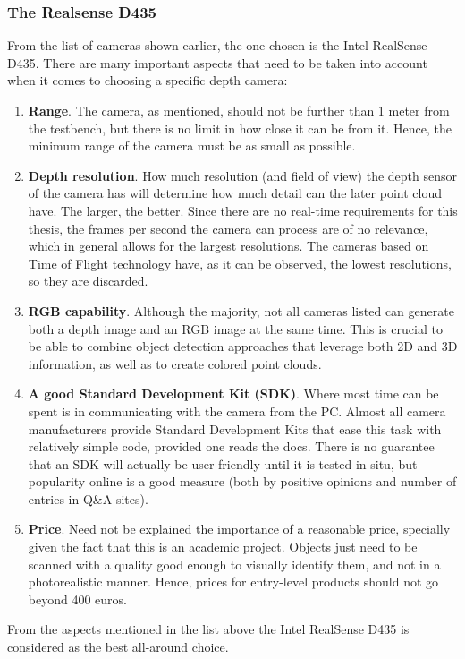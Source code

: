 \documentclass[../main.tex]{subfiles}
\begin{document}
\subsubsection{The Realsense D435}
From the list of cameras shown earlier, the one chosen is the Intel RealSense D435. There are many important aspects that need to be taken into account when it comes to choosing a specific depth camera:
\begin{enumerate}
    \item \textbf{Range}. The camera, as mentioned, should not be further than 1 meter from the testbench, but there is no limit in how close it can be from it. Hence, the minimum range of the camera must be as small as possible.
    \item \textbf{Depth resolution}. How much resolution (and field of view) the depth sensor of the camera has will determine how much detail can the later point cloud have. The larger, the better. Since there are no real-time requirements for this thesis, the frames per second the camera can process are of no relevance, which in general allows for the largest resolutions. The cameras based on Time of Flight technology have, as it can be observed, the lowest resolutions, so they are discarded. 
    \item \textbf{RGB capability}. Although the majority, not all cameras listed can generate both a depth image and an RGB image at the same time. This is crucial to be able to combine object detection approaches that leverage both 2D and 3D information, as well as to create colored point clouds.
    \item \textbf{A good Standard Development Kit (SDK)}. Where most time can be spent is in communicating with the camera from the PC. Almost all camera manufacturers provide Standard Development Kits that ease this task with relatively simple code, provided one reads the docs. There is no guarantee that an SDK will actually be user-friendly until it is tested in situ, but popularity online is a good measure (both by positive opinions and number of entries in Q\&A sites).
    \item \textbf{Price}. Need not be explained the importance of a reasonable price, specially given the fact that this is an academic project. Objects just need to be scanned with a quality good enough to visually identify them, and not in a photorealistic manner. Hence, prices for entry-level products should not go beyond 400 euros.
\end{enumerate}
From the aspects mentioned in the list above the Intel RealSense D435 is considered as the best all-around choice. 
\end{document}
